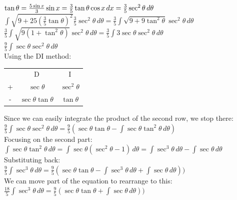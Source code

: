 \documentclass[../main.tex]{subfiles}
\begin{document}
\begin{enumerate}
    \(\tan{\theta}=\frac{5\sin{x}}{3}\\
    \sin{x}=\frac{3}{5}\tan{\theta}\\
    \cos{x}\,dx=\frac{3}{5}\sec^2{\theta}\,d\theta\)\\

    \(\int \sqrt{9+25(\frac{3}{5}\tan{\theta})^2}\frac{3}{5}\sec^2{\theta}\,d\theta=\frac{3}{5}\int \sqrt{9+9\tan^2{\theta}}\sec^2{\theta}\,d\theta\)\\

    \(\frac{3}{5}\int \sqrt{9(1+\tan^2{\theta})}\sec^2{\theta}\,d\theta=\frac{3}{5}\int 3\sec{\theta}\sec^2{\theta}\,d\theta\)\\

    \(\frac{9}{5}\int \sec{\theta}\sec^2{\theta}\,d\theta\)\\

    Using the DI method:\\
    \begin{tabular}{ c c c }
       & D & I \\ 
     +  & $\sec{\theta}$ &$\sec^2{\theta}$ \\  
     - & $\sec{\theta}\tan{\theta}$ & $\tan{\theta}$\\ 
    \end{tabular}

    Since we can easily integrate the product of the second row, we stop there:\\
    \(\frac{9}{5}\int \sec{\theta}\sec^2{\theta}\,d\theta=\frac{9}{5}(\sec{\theta}\tan{\theta}-\int \sec{\theta}\tan^2{\theta}\,d\theta)\)\\

    Focusing on the second part:\\
    \(\int \sec{\theta}\tan^2{\theta}\,d\theta=\int \sec{\theta}(\sec^2{\theta}-1)\,d\theta=\int \sec^3{\theta}\,d\theta -\int \sec{\theta}\,d\theta\)\\

    Substituting back:\\
    \(\frac{9}{5}\int \sec^3{\theta}\,d\theta=\frac{9}{5}(\sec{\theta}\tan{\theta}-\int \sec^3{\theta}\,d\theta +\int \sec{\theta}\,d\theta))\)\\

    We can move part of the equation to rearrange to this:\\
    \(\frac{18}{5}\int \sec^3{\theta}\,d\theta=\frac{9}{5}(\sec{\theta}\tan{\theta} +\int \sec{\theta}\,d\theta))\)\\


\end{enumerate}
\end{document}

